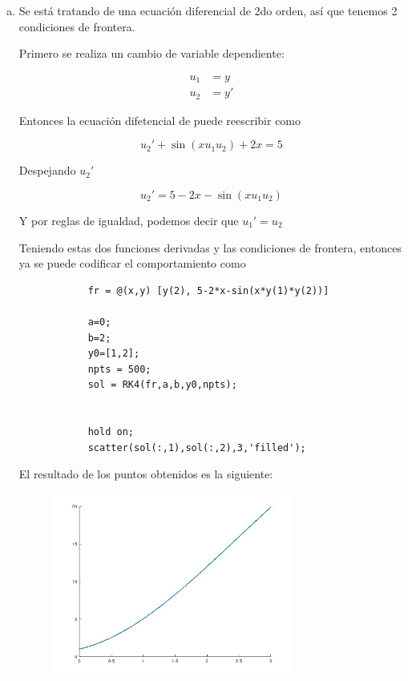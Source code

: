 \documentclass[a4paper, 12pt]{article}
\begin{document}
    \begin{enumerate}[a)]
        \item Se está tratando de una ecuación diferencial de 2do orden, así que tenemos 2 condiciones de frontera.
        
        Primero se realiza un cambio de variable dependiente:

        \begin{align*}
            u_1 &= y \\
            u_2 &= y'
        \end{align*}

        Entonces la ecuación difetencial de puede reescribir como

        \[
            u_2'+ \sin (x u_1 u_2) + 2x = 5
        \]

        Despejando $u_2'$

        \[
            u_2' = 5 - 2x - \sin (x u_1 u_2)
        \]

        Y por reglas de igualdad, podemos decir que $u_1' = u_2$

        Teniendo estas dos funciones derivadas y las condiciones de frontera, entonces ya se puede codificar el comportamiento como

        \begin{verbatim}
            fr = @(x,y) [y(2), 5-2*x-sin(x*y(1)*y(2))]

            a=0;
            b=2;
            y0=[1,2];
            npts = 500;
            sol = RK4(fr,a,b,y0,npts);


            hold on;
            scatter(sol(:,1),sol(:,2),3,'filled');
        \end{verbatim}

        El resultado de los puntos obtenidos es la siguiente:

        \begin{figure}[ht!]
            \centering
            \includegraphics[width=8cm]{img/e1a.jpeg}
        \end{figure}


\end{enumerate}
\end{document}
